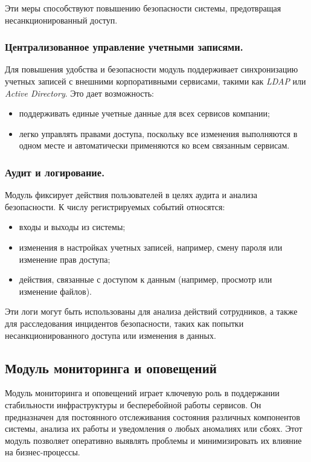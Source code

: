 Эти меры способствуют повышению безопасности системы, предотвращая несанкционированный доступ.

\subsubsection{Централизованное управление учетными записями.}
Для повышения удобства и безопасности модуль поддерживает синхронизацию учетных записей с внешними корпоративными сервисами, такими как \textit{LDAP} или \textit{Active Directory}. Это дает возможность:
\begin{itemize}
    \item поддерживать единые учетные данные для всех сервисов компании;
    \item легко управлять правами доступа, поскольку все изменения выполняются в одном месте и автоматически применяются ко всем связанным сервисам.
\end{itemize}

\subsubsection{Аудит и логирование.}
Модуль фиксирует действия пользователей в целях аудита и анализа безопасности. К числу регистрируемых событий относятся:
\begin{itemize}
    \item входы и выходы из системы;
    \item изменения в настройках учетных записей, например, смену пароля или изменение прав доступа;
    \item действия, связанные с доступом к данным (например, просмотр или изменение файлов).
\end{itemize}

Эти логи могут быть использованы для анализа действий сотрудников, а также для расследования инцидентов безопасности, таких как попытки несанкционированного доступа или изменения в данных.


\subsection{Модуль мониторинга и оповещений}
\label{sec:monitoring_alerting_functionality}

Модуль мониторинга и оповещений играет ключевую роль в поддержании стабильности инфраструктуры и бесперебойной работы сервисов. Он предназначен для постоянного отслеживания состояния различных компонентов системы, анализа их работы и уведомления о любых аномалиях или сбоях. Этот модуль позволяет оперативно выявлять проблемы и минимизировать их влияние на бизнес-процессы.

